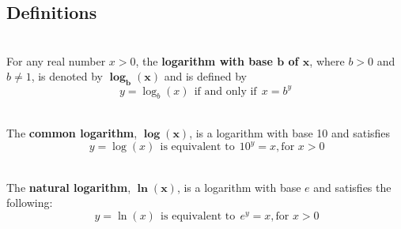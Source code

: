 \subsection*{Definitions } \label{def-logarithmic-intro}

\begin{myDefinition}[Logarithm:]~\\[0.5mm]
For any real number $x>0$, the \textbf{logarithm with base $\boldsymbol{b}$ of $\boldsymbol{x}$}, where $b>0$ and $b\neq 1$, is denoted by $\boldsymbol{\log_b (x)}$ and is defined by
			$$
					y = \log_b (x) \ \  \textrm{if and only if} \ \  x = b^y
			$$
\end{myDefinition}

\begin{myDefinition}~\\[0.5mm]
The {\bf common logarithm}, $\boldsymbol{\log(x)}$, is a logarithm with base 10 and satisfies
$$ \ y=\log(x) \ \ \text{is equivalent to} \ \ 10^y=x, \text{for } x>0 $$
 \end{myDefinition}

\begin{myDefinition}~\\[0.5mm]
The {\bf natural logarithm}, $\boldsymbol{\ln(x)}$, is a logarithm with base $e$ and satisfies the following:
$$ \ y=\ln(x) \ \ \text{is equivalent to} \ \ e^y=x, \text{for } x>0 $$
\end{myDefinition}


